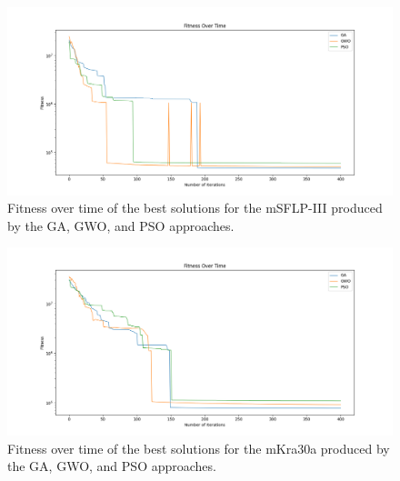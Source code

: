 \begin{figure}[h!]
\centering
\begin{adjustwidth}{-0.45in}{}
\includegraphics[scale=0.5]{./images/chap07-rd/best-fitness-over-time-msflp3.png}
\end{adjustwidth}
\caption{Fitness over time of the best solutions for the mSFLP-III produced by the GA, GWO, and PSO approaches.}
\label{graph-approaches-best-solutions-msflp-iii}
\end{figure}

\begin{figure}[h!]
\centering
\begin{adjustwidth}{-0.45in}{}
\includegraphics[scale=0.5]{./images/chap07-rd/best-fitness-over-time-mKra30a.png}
\end{adjustwidth}
\caption{Fitness over time of the best solutions for the mKra30a produced by the GA, GWO, and PSO approaches.}
\label{graph-approaches-best-solutions-mkra30a}
\end{figure}


